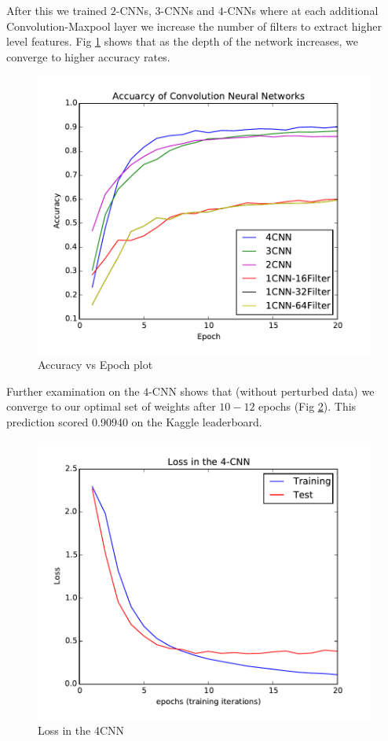 \documentclass[conference]{IEEEtran}
\begin{document}
After this we trained $2$-CNNs, $3$-CNNs and $4$-CNNs where at each additional Convolution-Maxpool layer we increase the number of filters to extract higher level features. Fig \ref{CNNacc} shows that as the depth of the network increases, we converge to higher accuracy rates.

\begin{figure}[h]
	\label{CNNacc}
	\centering
	\includegraphics[scale=0.6]{CNNacc.pdf}
	\caption{Accuracy vs Epoch plot}
\end{figure}

Further examination on the $4$-CNN shows that (without perturbed data) we converge to our optimal set of weights after $10-12$ epochs (Fig \ref{C4NNacc}). This prediction scored 0.90940 on the Kaggle leaderboard.

\begin{figure}[h]
	\label{C4NNacc}
	\centering
	\includegraphics[scale=0.6]{4CNNloss.pdf}
	\caption{Loss in the 4CNN}
\end{figure}
\end{document}
